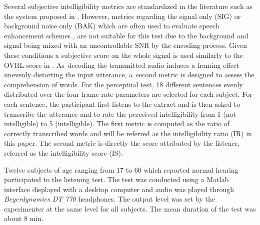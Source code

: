 \documentclass[sensors,article,accept,moreauthors,pdftex,10pt,a4paper]{mdpi}
\begin{document}
Several subjective intelligibility metrics are standardized in the literature such as the system proposed in \cite{itup835}. However, metrics regarding the signal only (SIG) or background noise only (BAK) which are often used to evaluate speech enhancement schemes \citep{ntalampiras2008}, are not suitable for this test due to the background and signal being mixed with an uncontrollable SNR by the encoding process. Given these conditions a subjective score on the whole signal is used similarly to the OVRL score in \cite{itup835}. As~decoding the transmitted audio induces a framing effect unevenly distorting the input utterance, a~second metric is designed to assess the comprehension of words. For the perceptual test, 18 different sentences evenly distributed over the {four} frame rate parameters are selected for each subject. For each {sentence,} the participant first listens to the extract and is then asked to transcribe the utterance and to rate the perceived intelligibility from 1 (not intelligible) to 5 (intelligible). The first metric is computed as the ratio of correctly transcribed words and will be referred as the intelligibility ratio (IR) in this paper. The second metric is directly the score attributed by the listener, referred as the intelligibility score (IS).

{Twelve} subjects of age ranging from 17 to 60 which reported normal hearing participated to the listening test. The test was conducted using a Matlab interface displayed with a desktop computer and audio was played through \textit{Beyerdynamics DT 770} headphones. The output level was set by the experimenter at the same level for all subjects. The mean duration of the test was about 8 min.
\end{document}
